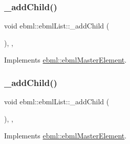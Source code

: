 \subsubsection{\texorpdfstring{\+\_\+add\+Child()}{\_addChild()}\hspace{0.1cm}{\footnotesize\ttfamily [1/2]}}
{\footnotesize\ttfamily void ebml\+::ebml\+List\+::\+\_\+add\+Child (\begin{DoxyParamCaption}\item[{const \mbox{\hyperlink{namespaceebml_adad533b7705a16bb360fe56380c5e7be}{ebml\+Element\+\_\+sp}} \&}]{ }\end{DoxyParamCaption})\hspace{0.3cm}{\ttfamily [override]}, {\ttfamily [protected]}, {\ttfamily [virtual]}}



Implements \mbox{\hyperlink{classebml_1_1ebmlMasterElement_a59c5f3b3409fd5fd6f0f22c7a68f1c9b}{ebml\+::ebml\+Master\+Element}}.

\mbox{\label{classebml_1_1ebmlList_a372e75614d5c93b7d7a55548c45c2d2f}} 
\subsubsection{\texorpdfstring{\+\_\+add\+Child()}{\_addChild()}\hspace{0.1cm}{\footnotesize\ttfamily [2/2]}}
{\footnotesize\ttfamily void ebml\+::ebml\+List\+::\+\_\+add\+Child (\begin{DoxyParamCaption}\item[{\mbox{\hyperlink{namespaceebml_adad533b7705a16bb360fe56380c5e7be}{ebml\+Element\+\_\+sp}} \&\&}]{ }\end{DoxyParamCaption})\hspace{0.3cm}{\ttfamily [override]}, {\ttfamily [protected]}, {\ttfamily [virtual]}}



Implements \mbox{\hyperlink{classebml_1_1ebmlMasterElement_a3af0270846a1ced1719d26dd261f0355}{ebml\+::ebml\+Master\+Element}}.

\mbox{\label{classebml_1_1ebmlList_a95b8de53fe3688ba73ee488e8ca94566}} 
